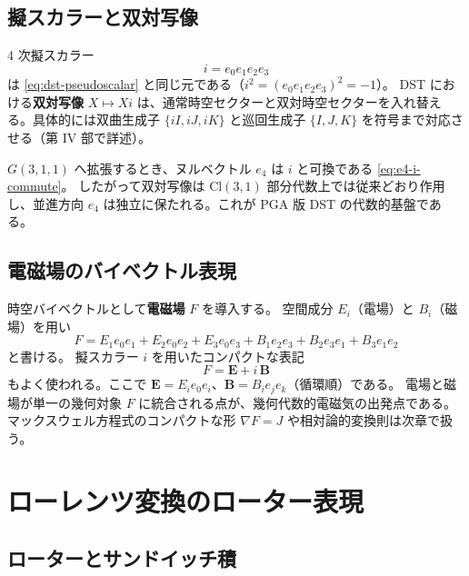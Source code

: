 \documentclass[dvipdfmx,a4paper,oneside]{jsbook}
\numberwithin{equation}{chapter}
\begin{document}
\subsection{擬スカラーと双対写像}

4 次擬スカラー
\begin{equation}
  i = e_0 e_1 e_2 e_3
  \label{eq:cl31-pseudoscalar}
\end{equation}
は \eqref{eq:dst-pseudoscalar} と同じ元である（\(i^2 = (e_0 e_1 e_2 e_3)^2 = -1\)）。
DST における\textbf{双対写像} \(X \mapsto Xi\) は、通常時空セクターと双対時空セクターを入れ替える。具体的には双曲生成子 \(\{iI,iJ,iK\}\) と巡回生成子 \(\{I,J,K\}\) を符号まで対応させる（第 IV 部で詳述）。

\(G(3,1,1)\) へ拡張するとき、ヌルベクトル \(e_4\) は \(i\) と可換である \eqref{eq:e4-i-commute}。
したがって双対写像は \(\mathrm{Cl}(3,1)\) 部分代数上では従来どおり作用し、並進方向 \(e_4\) は独立に保たれる。これが PGA 版 DST の代数的基盤である。

\subsection{電磁場のバイベクトル表現}

時空バイベクトルとして\textbf{電磁場} \(F\) を導入する。
空間成分 \(E_i\)（電場）と \(B_i\)（磁場）を用い
\begin{equation}
  F = E_1 e_0 e_1 + E_2 e_0 e_2 + E_3 e_0 e_3
    + B_1 e_2 e_3 + B_2 e_3 e_1 + B_3 e_1 e_2
  \label{eq:em-bivector}
\end{equation}
と書ける。
擬スカラー \(i\) を用いたコンパクトな表記
\begin{equation}
  F = \mathbf{E} + i\,\mathbf{B}
  \label{eq:em-compact}
\end{equation}
もよく使われる。ここで \(\mathbf{E} = E_i e_0 e_i\)、\(\mathbf{B} = B_i e_j e_k\)（循環順）である。
電場と磁場が単一の幾何対象 \(F\) に統合される点が、幾何代数的電磁気の出発点である。
マックスウェル方程式のコンパクトな形 \(\nabla F = J\) や相対論的変換則は次章で扱う。

\section{ローレンツ変換のローター表現}

\subsection{ローターとサンドイッチ積}
\end{document}
